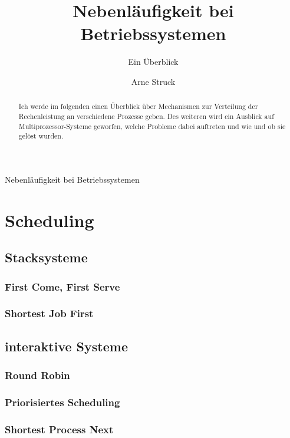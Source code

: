 \title{Nebenläufigkeit bei Betriebssystemen}
\subtitle{Ein Überblick}

\author{Arne Struck}


\maketitle
\pagebreak


{Nebenläufigkeit bei Betriebssystemen}

\begin{abstract}
Ich werde im folgenden einen Überblick über Mechanismen zur Verteilung der Rechenleistung an verschiedene
Prozesse geben. Des weiteren wird ein Ausblick auf Multiprozessor-Systeme geworfen, welche Probleme dabei auftreten und wie und ob sie gelöst wurden. 
\end{abstract}
\pagebreak
\section{Scheduling}
\subsection{Stacksysteme}
\subsubsection{First Come, First Serve}
\subsubsection{Shortest Job First}
\subsection{interaktive Systeme}
\subsubsection{Round Robin}
\subsubsection{Priorisiertes Scheduling}
\subsubsection{Shortest Process Next}
